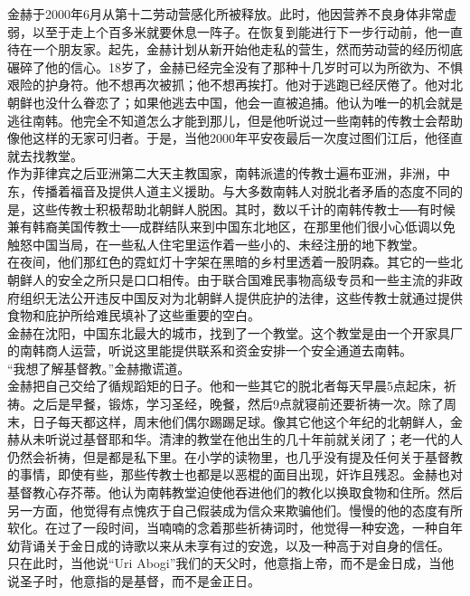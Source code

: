 金赫于2000年6月从第十二劳动营感化所被释放。此时，他因营养不良身体非常虚弱，以至于走上个百多米就要休息一阵子。在恢复到能进行下一步行动前，他一直待在一个朋友家。起先，金赫计划从新开始他走私的营生，然而劳动营的经历彻底碾碎了他的信心。18岁了，金赫已经完全没有了那种十几岁时可以为所欲为、不惧艰险的护身符。他不想再次被抓；他不想再挨打。他对于逃跑已经厌倦了。他对北朝鲜也没什么眷恋了；如果他逃去中国，他会一直被追捕。他认为唯一的机会就是逃往南韩。他完全不知道怎么才能到那儿，但是他听说过一些南韩的传教士会帮助像他这样的无家可归者。于是，当他2000年平安夜最后一次度过图们江后，他径直就去找教堂。\\

作为菲律宾之后亚洲第二大天主教国家，南韩派遣的传教士遍布亚洲，非洲，中东，传播着福音及提供人道主义援助。与大多数南韩人对脱北者矛盾的态度不同的是，这些传教士积极帮助北朝鲜人脱困。其时，数以千计的南韩传教士──有时候兼有韩裔美国传教士──成群结队来到中国东北地区，在那里他们很小心低调以免触怒中国当局，在一些私人住宅里运作着一些小的、未经注册的地下教堂。\\

在夜间，他们那红色的霓虹灯十字架在黑暗的乡村里透着一股阴森。其它的一些北朝鲜人的安全之所只是口口相传。由于联合国难民事物高级专员和一些主流的非政府组织无法公开违反中国反对为北朝鲜人提供庇护的法律，这些传教士就通过提供食物和庇护所给难民填补了这些重要的空白。\\

金赫在沈阳，中国东北最大的城市，找到了一个教堂。这个教堂是由一个开家具厂的南韩商人运营，听说这里能提供联系和资金安排一个安全通道去南韩。\\

“我想了解基督教。”金赫撒谎道。\\

金赫把自己交给了循规蹈矩的日子。他和一些其它的脱北者每天早晨5点起床，祈祷。之后是早餐，锻炼，学习圣经，晚餐，然后9点就寝前还要祈祷一次。除了周末，日子每天都这样，周末他们偶尔踢踢足球。像其它他这个年纪的北朝鲜人，金赫从未听说过基督耶和华。清津的教堂在他出生的几十年前就关闭了；老一代的人仍然会祈祷，但是都是私下里。在小学的读物里，也几乎没有提及任何关于基督教的事情，即使有些，那些传教士也都是以恶棍的面目出现，奸诈且残忍。金赫也对基督教心存芥蒂。他认为南韩教堂迫使他吞进他们的教化以换取食物和住所。然后另一方面，他觉得有点愧疚于自己假装成为信众来欺骗他们。慢慢的他的态度有所软化。在过了一段时间，当喃喃的念着那些祈祷词时，他觉得一种安逸，一种自年幼背诵关于金日成的诗歌以来从未享有过的安逸，以及一种高于对自身的信任。\\

只在此时，当他说“Uri Abogi”我们的天父时，他意指上帝，而不是金日成，当他说圣子时，他意指的是基督，而不是金正日。\\

